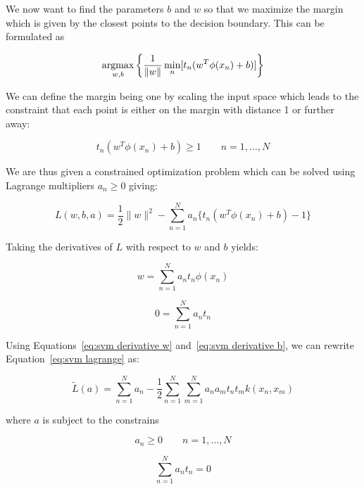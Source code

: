 We now want to find the parameters $b$ and $w$ so that we maximize the margin which is given by the closest points to the decision boundary. This can be formulated as

\begin{equation}
	\argmax_{w, b} \left\{ \frac{1}{\|w\|} \min_n [ t_n (w^T \phi(x_n) + b) ] \right\}
\end{equation}

We can define the margin being one by scaling the input space which leads to the constraint that each point is either on the margin with distance 1 or further away:

\begin{equation}
	t_n (w^T \phi(x_n) + b) \geq 1 \quad\quad n = 1, \ldots, N
\end{equation}

We are thus given a constrained optimization problem which can be solved using Lagrange multipliers $a_n \geq 0$ giving:

\begin{equation}
	L(w, b, a) = \frac{1}{2} \|w\|^2 - \sum_{n=1}^N a_n \{ t_n (w^T \phi(x_n) + b) -1 \}
	\label{eq:svm lagrange}
\end{equation}

Taking the derivatives of $L$ with respect to $w$ and $b$ yields:

\begin{equation}
	w = \sum_{n=1}^N a_n t_n \phi(x_n)
	\label{eq:svm derivative w}
\end{equation}

\begin{equation}
	0 = \sum_{n=1}^N a_n t_n
	\label{eq:svm derivative b}
\end{equation}

Using Equations~\ref{eq:svm derivative w} and~\ref{eq:svm derivative b}, we can rewrite Equation~\ref{eq:svm lagrange} as:

\begin{equation}
	\widetilde{L}(a) = \sum_{n=1}^N a_n - \frac{1}{2} \sum_{n=1}^N \sum_{m=1}^N a_n a_m t_n t_m k(x_n, x_m)
\end{equation}

where $a$ is subject to the constrains

\begin{equation}
	a_n \geq 0 \quad \quad n = 1, \ldots, N
\end{equation}

\begin{equation}
	\sum_{n=1}^N a_n t_n = 0
\end{equation}

